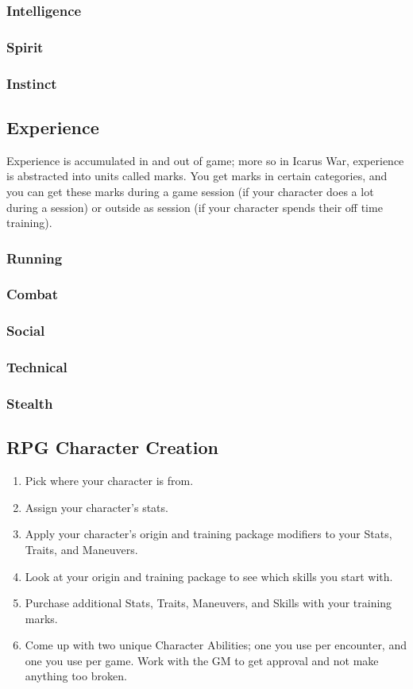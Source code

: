 \documentclass{article}
\begin{document}
\begin{multicols}{2}
\subsubsection{Intelligence}
\subsubsection{Spirit}
\subsubsection{Instinct}
\subsection{Experience}
Experience is accumulated in and out of game; more so in Icarus War, experience
is abstracted into units called marks. You get marks in certain categories, and
you can get these marks during a game session (if your character does a lot
during a session) or outside as session (if your character spends their off
time training).
\subsubsection{Running}
\subsubsection{Combat}
\subsubsection{Social}
\subsubsection{Technical}
\subsubsection{Stealth}
\subsection{RPG Character Creation}
\begin{enumerate}
  \item Pick where your character is from.
  \item Assign your character's stats.
  \item Apply your character’s origin and training package modifiers to your
  Stats, Traits, and Maneuvers.
  \item Look at your origin and training package to see which skills you
  start with.
  \item Purchase additional Stats, Traits, Maneuvers, and Skills with your
  training marks.
  \item Come up with two unique Character Abilities; one you use per encounter,
  and one you use per game. Work with the GM to get approval and not make
  anything too broken.
\end{enumerate}

\end{multicols}
\end{document}
